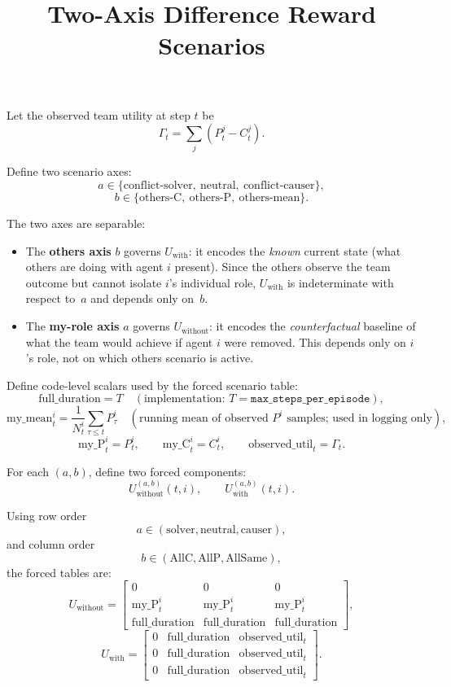 \documentclass[11pt]{article}
\title{Two-Axis Difference Reward Scenarios}
\author{}
\date{}
\begin{document}
\maketitle

Let the observed team utility at step $t$ be
\[
\Gamma_t = \sum_j (P_t^j - C_t^j).
\]

Define two scenario axes:
\[
a \in \{\text{conflict-solver},\ \text{neutral},\ \text{conflict-causer}\},
\]
\[
b \in \{\text{others-C},\ \text{others-P},\ \text{others-mean}\}.
\]

The two axes are separable:
\begin{itemize}
  \item The \textbf{others axis} $b$ governs $U_{\text{with}}$: it encodes the \emph{known} current state (what others are doing with agent $i$ present). Since the others observe the team outcome but cannot isolate $i$'s individual role, $U_{\text{with}}$ is indeterminate with respect to~$a$ and depends only on~$b$.
  \item The \textbf{my-role axis} $a$ governs $U_{\text{without}}$: it encodes the \emph{counterfactual} baseline of what the team would achieve if agent $i$ were removed. This depends only on $i$'s role, not on which others scenario is active.
\end{itemize}

Define code-level scalars used by the forced scenario table:
\[
\text{full\_duration} = T \quad (\text{implementation: } T=\texttt{max\_steps\_per\_episode}),
\]
\[
\text{my\_mean}_t^i = \frac{1}{N_t^i}\sum_{\tau \le t} P_\tau^i
\quad
(\text{running mean of observed } P^i \text{ samples; used in logging only}),
\]
\[
\text{my\_P}_t^i = P_t^i,\qquad \text{my\_C}_t^i = C_t^i,\qquad
\text{observed\_util}_t = \Gamma_t.
\]

For each $(a,b)$, define two forced components:
\[
U_{\text{without}}^{(a,b)}(t,i),\qquad U_{\text{with}}^{(a,b)}(t,i).
\]

Using row order
\[
a \in (\text{solver},\text{neutral},\text{causer}),
\]
and column order
\[
b \in (\text{AllC},\text{AllP},\text{AllSame}),
\]
the forced tables are:
\[
U_{\text{without}}=
\begin{bmatrix}
0 & 0 & 0 \\
\text{my\_P}_t^i & \text{my\_P}_t^i & \text{my\_P}_t^i \\
\text{full\_duration} & \text{full\_duration} & \text{full\_duration}
\end{bmatrix},
\]
\[
U_{\text{with}}=
\begin{bmatrix}
0 & \text{full\_duration} & \text{observed\_util}_t \\
0 & \text{full\_duration} & \text{observed\_util}_t \\
0 & \text{full\_duration} & \text{observed\_util}_t
\end{bmatrix}.
\]
\end{document}
